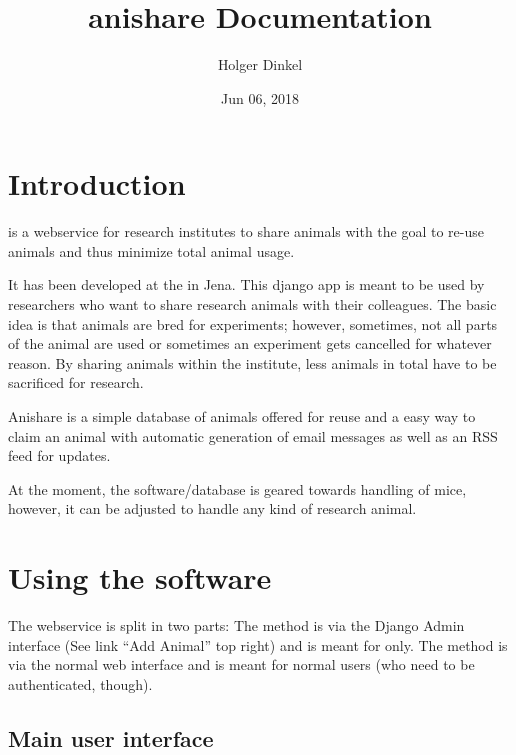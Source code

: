 \documentclass[letterpaper,10pt,openany,oneside,english]{sphinxmanual}
\title{anishare Documentation}
\date{Jun 06, 2018}
\author{Holger Dinkel}
\begin{document}
\maketitle
\sphinxtableofcontents
{}\label{\detokenize{index::doc}}



\chapter{Introduction}
\label{\detokenize{index:introduction}}
 is a webservice for research institutes to share animals with the goal to re-use
animals and thus minimize total animal usage.

It has been developed at the  in
Jena. This django app is meant to be used by researchers who want to share research animals with
their colleagues. The basic idea is that animals are bred for experiments; however, sometimes, not
all parts of the animal are used or sometimes an experiment gets cancelled for whatever reason. By
sharing animals within the institute, less animals in total have to be sacrificed for research.

Anishare is a simple database of animals offered for reuse and a easy way to claim an animal with
automatic generation of email messages as well as an RSS feed for updates.

\noindent{}

At the moment, the software/database is geared towards handling of mice, however, it can be adjusted
to handle any kind of research animal.


\chapter{Using the software}
\label{\detokenize{index:using-the-software}}
\noindent{}

The webservice is split in two parts: The  method is via the Django Admin interface (See link
“Add Animal” top right) and is meant for  only.
The  method is via the normal web interface and is meant for normal users (who need to be
authenticated, though).


\section{Main user interface}
\label{\detokenize{index:main-user-interface}}
\end{document}
